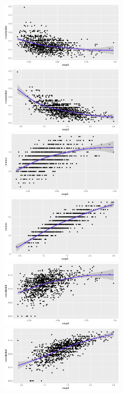 \documentclass{article}
\begin{document}
\begin{figure}[htbp!]
  \centering{}
  \includegraphics[width=6cm]{img/rel1000groupCoopMod}\quad\quad
  \includegraphics[width=6cm]{img/relS1000groupCoopMod}\\
  \includegraphics[width=6cm]{img/rel1000groupCoopTam}\quad\quad
  \includegraphics[width=6cm]{img/relS1000groupCoopTam}\\
  \includegraphics[width=6cm]{img/rel1000groupCoopTrans}\quad\quad
  \includegraphics[width=6cm]{img/relS1000groupCoopTrans}\\

\end{figure}
\end{document}
